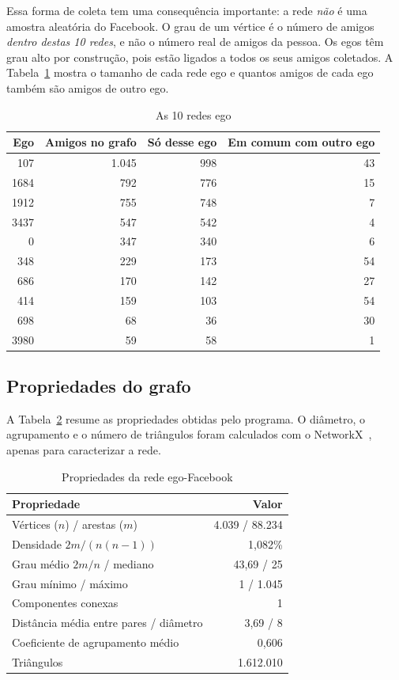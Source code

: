 \documentclass[conference]{IEEEtran}
\begin{document}
Essa forma de coleta tem uma consequência importante: a rede \emph{não} é uma amostra aleatória do Facebook. O grau de um vértice é o número de amigos \emph{dentro destas 10 redes}, e não o número real de amigos da pessoa. Os egos têm grau alto por construção, pois estão ligados a todos os seus amigos coletados. A Tabela~\ref{tab:egos} mostra o tamanho de cada rede ego e quantos amigos de cada ego também são amigos de outro ego.

\begin{table}[htbp]
\caption{As 10 redes ego}
\label{tab:egos}
\centering
\begin{tabular}{rrrr}
\toprule
Ego & Amigos no grafo & Só desse ego & Em comum com outro ego \\
\midrule
107 & 1.045 & 998 & 43 \\
1684 & 792 & 776 & 15 \\
1912 & 755 & 748 & 7 \\
3437 & 547 & 542 & 4 \\
0 & 347 & 340 & 6 \\
348 & 229 & 173 & 54 \\
686 & 170 & 142 & 27 \\
414 & 159 & 103 & 54 \\
698 & 68 & 36 & 30 \\
3980 & 59 & 58 & 1 \\
\bottomrule
\end{tabular}
\end{table}

\subsection{Propriedades do grafo}

A Tabela~\ref{tab:base} resume as propriedades obtidas pelo programa. O diâmetro, o agrupamento e o número de triângulos foram calculados com o NetworkX~\cite{networkx2008}, apenas para caracterizar a rede.

\begin{table}[htbp]
\caption{Propriedades da rede ego-Facebook}
\label{tab:base}
\centering
\begin{tabular}{lr}
\toprule
Propriedade & Valor \\
\midrule
Vértices ($n$) / arestas ($m$) & 4.039 / 88.234 \\
Densidade $2m/(n(n-1))$ & 1,082\% \\
Grau médio $2m/n$ / mediano & 43,69 / 25 \\
Grau mínimo / máximo & 1 / 1.045 \\
Componentes conexas & 1 \\
Distância média entre pares / diâmetro & 3,69 / 8 \\
Coeficiente de agrupamento médio & 0,606 \\
Triângulos & 1.612.010 \\
\bottomrule
\end{tabular}
\end{table}
\end{document}

